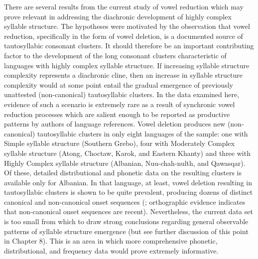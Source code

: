   There are several results from the current study of vowel reduction which may prove relevant in addressing the diachronic development of highly complex syllable structure. The hypotheses were motivated by the observation that vowel reduction, specifically in the form of vowel deletion, is a documented source of tautosyllabic consonant clusters. It should therefore be an important contributing factor to the development of the long consonant clusters characteristic of languages with highly complex syllable structure. If increasing syllable structure complexity represents a diachronic cline, then an increase in syllable structure complexity would at some point entail the gradual emergence of previously unattested (non-canonical) tautosyllabic clusters. In the data examined here, evidence of such a scenario is extremely rare as a result of synchronic vowel reduction processes which are salient enough to be reported as productive patterns by authors of language references. Vowel deletion produces new (non-canonical) tautosyllabic clusters in only eight languages of the sample: one with Simple syllable structure (Southern Grebo), four with Moderately Complex syllable structure (Atong, Choctaw, Karok, and Eastern Khanty) and three with Highly Complex syllable structure (Albanian, Nuu-chah-nulth, and Qawasqar). Of these, detailed distributional and phonetic data on the resulting clusters is available only for Albanian. In that language, at least, vowel deletion resulting in tautosyllabic clusters is shown to be quite prevalent, producing dozens of distinct canonical and non-canonical onset sequences (\citealt{Klippenstein2010}; orthographic evidence indicates that non-canonical onset sequences are recent). Nevertheless, the current data set is too small from which to draw strong conclusions regarding general observable patterns of syllable structure emergence (but see further discussion of this point in Chapter 8). This is an area in which more comprehensive phonetic, distributional, and frequency data would prove extremely informative.

